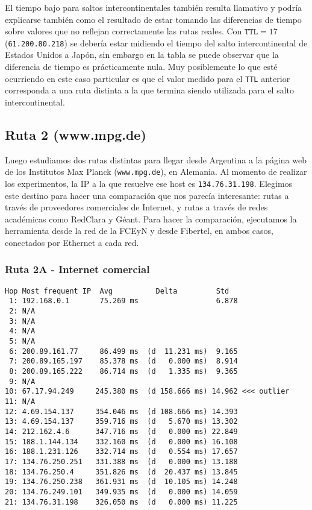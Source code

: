 El tiempo bajo para saltos intercontinentales también resulta llamativo y podría
explicarse también como el resultado de estar tomando las diferencias de tiempo
sobre valores que no reflejan correctamente las rutas reales. Con $\texttt{TTL}
= 17$ (\texttt{61.200.80.218}) se debería estar midiendo el tiempo del salto
intercontinental de Estados Unidos a Japón, sin embargo en la tabla se puede
observar que la diferencia de tiempo es prácticamente nula. Muy posiblemente lo
que esté ocurriendo en este caso particular es que el valor medido para el
\texttt{TTL} anterior corresponda a una ruta distinta a la que termina siendo
utilizada para el salto intercontinental.


\subsection{Ruta 2 (www.mpg.de)}

Luego estudiamos dos rutas distintas para llegar desde Argentina a la página web de los Institutos Max Planck (\texttt{www.mpg.de}), en Alemania. Al momento de realizar los experimentos, la IP a la que resuelve ese host es \texttt{134.76.31.198}. Elegimos este destino para hacer una comparación que nos parecía interesante: rutas a través de proveedores comerciales de Internet, y rutas a través de redes académicas como RedClara y Géant. Para hacer la comparación, ejecutamos la herramienta desde la red de la FCEyN y desde Fibertel, en ambos casos, conectados por Ethernet a cada red.

\subsubsection{Ruta 2A - Internet comercial}




\begin{Verbatim}[fontsize=\small]
 Hop Most frequent IP  Avg          Delta         Std
 1: 192.168.0.1       75.269 ms                  6.878 
 2: N/A            
 3: N/A            
 4: N/A            
 5: N/A            
 6: 200.89.161.77     86.499 ms  (d  11.231 ms)  9.165 
 7: 200.89.165.197    85.378 ms  (d   0.000 ms)  8.914 
 8: 200.89.165.222    86.714 ms  (d   1.335 ms)  9.365 
 9: N/A            
10: 67.17.94.249     245.380 ms  (d 158.666 ms) 14.962 <<< outlier
11: N/A            
12: 4.69.154.137     354.046 ms  (d 108.666 ms) 14.393 
13: 4.69.154.137     359.716 ms  (d   5.670 ms) 13.302 
14: 212.162.4.6      347.716 ms  (d   0.000 ms) 22.849 
15: 188.1.144.134    332.160 ms  (d   0.000 ms) 16.108 
16: 188.1.231.126    332.714 ms  (d   0.554 ms) 17.657 
17: 134.76.250.251   331.388 ms  (d   0.000 ms) 13.188 
18: 134.76.250.4     351.826 ms  (d  20.437 ms) 13.845 
19: 134.76.250.238   361.931 ms  (d  10.105 ms) 14.248 
20: 134.76.249.101   349.935 ms  (d   0.000 ms) 14.059 
21: 134.76.31.198    326.050 ms  (d   0.000 ms) 11.225
\end{Verbatim}


